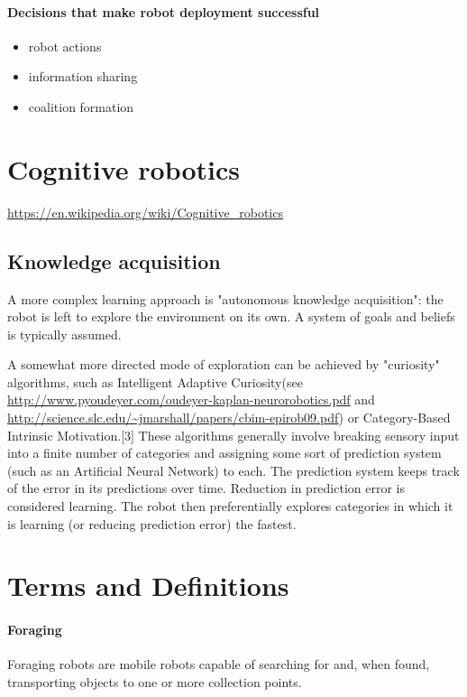 \documentclass{article}
\begin{document}
   		\paragraph{Decisions that make robot deployment successful}
   			\begin{itemize}
   				\item  robot actions
   				\item  information sharing
   				\item  coalition formation
   			\end{itemize}
   	\section{Cognitive robotics}
   	\url{https://en.wikipedia.org/wiki/Cognitive_robotics}	
   		\subsection{Knowledge acquisition}
   		A more complex learning approach is "autonomous knowledge acquisition": the robot is left to explore the environment on its own. A system of goals and beliefs is typically assumed.
   		
   		A somewhat more directed mode of exploration can be achieved by "curiosity" algorithms, such as Intelligent Adaptive Curiosity(see \url{http://www.pyoudeyer.com/oudeyer-kaplan-neurorobotics.pdf} and \url{http://science.slc.edu/~jmarshall/papers/cbim-epirob09.pdf}) or Category-Based Intrinsic Motivation.[3] These algorithms generally involve breaking sensory input into a finite number of categories and assigning some sort of prediction system (such as an Artificial Neural Network) to each. The prediction system keeps track of the error in its predictions over time. Reduction in prediction error is considered learning. The robot then preferentially explores categories in which it is learning (or reducing prediction error) the fastest.
 	\section{Terms and Definitions} 
 		\paragraph{Foraging} Foraging robots are mobile robots capable of searching for and, when found, transporting objects to one or more collection points.  
 		
	
\end{document}
